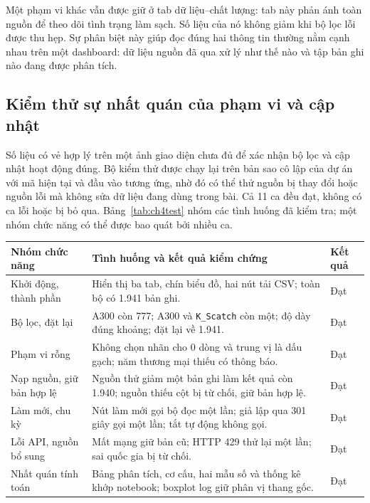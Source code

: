 \documentclass[12pt,a4paper,oneside]{report}
\newcommand{\maCot}[1]{{\urlstyle{tt}\def\UrlBreaks{\do\_\do\/\do\.}\def\UrlBigBreaks{}\nolinkurl{#1}}}
\begin{document}
Một phạm vi khác vẫn được giữ ở tab dữ liệu--chất lượng: tab này phản ánh toàn nguồn để theo dõi tình trạng làm sạch. Số liệu của nó không giảm khi bộ lọc lỗi được thu hẹp. Sự phân biệt này giúp đọc đúng hai thông tin thường nằm cạnh nhau trên một dashboard: dữ liệu nguồn đã qua xử lý như thế nào và tập bản ghi nào đang được phân tích.

\subsection{Kiểm thử sự nhất quán của phạm vi và cập nhật}

Số liệu có vẻ hợp lý trên một ảnh giao diện chưa đủ để xác nhận bộ lọc và cập nhật hoạt động đúng. Bộ kiểm thử được chạy lại trên bản sao cô lập của dự án với mã hiện tại và đầu vào tương ứng, nhờ đó có thể thử nguồn bị thay đổi hoặc nguồn lỗi mà không sửa dữ liệu đang dùng trong bài. Cả 11 ca đều đạt, không có ca lỗi hoặc bị bỏ qua. Bảng~\ref{tab:ch4test} nhóm các tình huống đã kiểm tra; một nhóm chức năng có thể được bao quát bởi nhiều ca.

\begin{center}\begin{minipage}{\linewidth}
\label{tab:ch4test}
\small{}
\begin{tabularx}{\linewidth}{@{}p{3.0cm}Y p{0.9cm}@{}}
\toprule
Nhóm chức năng & Tình huống và kết quả kiểm chứng & Kết quả \\
\midrule
Khởi động, thành phần & Hiển thị ba tab, chín biểu đồ, hai nút tải CSV; toàn bộ có 1.941 bản ghi. & Đạt \\
Bộ lọc, đặt lại & A300 còn 777; A300 và \maCot{K_Scatch} còn một; độ dày đúng khoảng; đặt lại về 1.941. & Đạt \\
Phạm vi rỗng & Không chọn nhãn cho 0 dòng và trung vị là dấu gạch; năm thương mại thiếu có thông báo. & Đạt \\
Nạp nguồn, giữ bản hợp lệ & Nguồn thử giảm một bản ghi làm kết quả còn 1.940; nguồn thiếu cột bị từ chối, giữ bản hợp lệ. & Đạt \\
Làm mới, chu kỳ & Nút làm mới gọi bộ đọc một lần; giả lập qua 301 giây gọi một lần; tắt tự động không gọi. & Đạt \\
Lỗi API, nguồn bổ sung & Mất mạng giữ bản cũ; HTTP 429 thử lại một lần; sai quốc gia bị từ chối. & Đạt \\
Nhất quán tính toán & Bảng phân tích, cơ cấu, hai mẫu số và thống kê khớp notebook; boxplot log giữ phân vị thang gốc. & Đạt \\
\bottomrule
\end{tabularx}
\end{minipage}\end{center}
\end{document}
